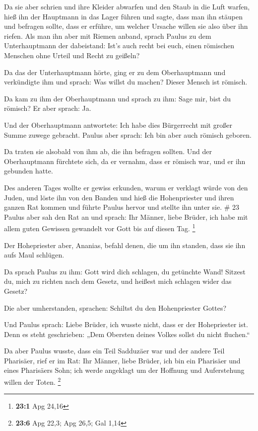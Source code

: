  Da sie aber schrien und ihre Kleider abwarfen und den
Staub in die Luft warfen,  hieß ihn der Hauptmann in das
Lager führen und sagte, dass man ihn stäupen und befragen sollte, dass
er erführe, um welcher Ursache willen sie also über ihn riefen.
 Als man ihn aber mit Riemen anband, sprach Paulus zu dem
Unterhauptmann der dabeistand: Ist's auch recht bei euch, einen
römischen Menschen ohne Urteil und Recht zu geißeln?

 Da das der Unterhauptmann hörte, ging er zu dem
Oberhauptmann und verkündigte ihm und sprach: Was willst du machen?
Dieser Mensch ist römisch.

 Da kam zu ihm der Oberhauptmann und sprach zu ihm: Sage
mir, bist du römisch? Er aber sprach: Ja.

 Und der Oberhauptmann antwortete: Ich habe dies
Bürgerrecht mit großer Summe zuwege gebracht. Paulus aber sprach: Ich
bin aber auch römisch geboren.

 Da traten sie alsobald von ihm ab, die ihn befragen
sollten. Und der Oberhauptmann fürchtete sich, da er vernahm, dass er
römisch war, und er ihn gebunden hatte.

 Des anderen Tages wollte er gewiss erkunden, warum er
verklagt würde von den Juden, und löste ihn von den Banden und hieß die
Hohenpriester und ihren ganzen Rat kommen und führte Paulus hervor und
stellte ihn unter sie. \# 23  Paulus aber sah den Rat an und
sprach: Ihr Männer, liebe Brüder, ich habe mit allem guten Gewissen
gewandelt vor Gott bis auf diesen Tag. \footnote{\textbf{23:1} Apg 24,16}

 Der Hohepriester aber, Ananias, befahl denen, die um ihn
standen, dass sie ihn aufs Maul schlügen.

 Da sprach Paulus zu ihm: Gott wird dich schlagen, du
getünchte Wand! Sitzest du, mich zu richten nach dem Gesetz, und heißest
mich schlagen wider das Gesetz?

 Die aber umherstanden, sprachen: Schiltst du den
Hohenpriester Gottes?

 Und Paulus sprach: Liebe Brüder, ich wusste nicht, dass er
der Hohepriester ist. Denn es steht geschrieben: „Dem Obersten deines
Volkes sollst du nicht fluchen.``

 Da aber Paulus wusste, dass ein Teil Sadduzäer war und der
andere Teil Pharisäer, rief er im Rat: Ihr Männer, liebe Brüder, ich bin
ein Pharisäer und eines Pharisäers Sohn; ich werde angeklagt um der
Hoffnung und Auferstehung willen der Toten. \footnote{\textbf{23:6} Apg
  22,3; Apg 26,5; Gal 1,14}

